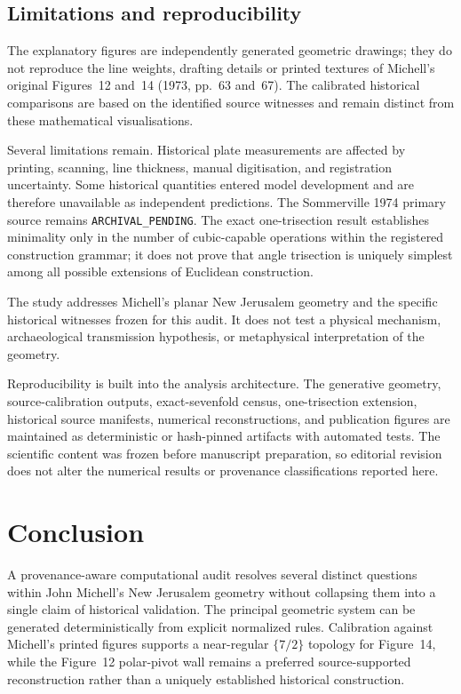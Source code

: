 \documentclass[11pt]{article}
\newcommand{\ArchivePending}{\texttt{ARCHIVAL\_PENDING}}
\begin{document}
\subsection{Limitations and reproducibility}

The explanatory figures are independently generated geometric drawings; they do not reproduce the line weights, drafting details or printed textures of Michell's original Figures~12 and~14 (1973, pp.~63 and~67). The calibrated historical comparisons are based on the identified source witnesses and remain distinct from these mathematical visualisations.\par



Several limitations remain.  Historical plate measurements are affected by
printing, scanning, line thickness, manual digitisation, and registration
uncertainty.  Some historical quantities entered model development and are
therefore unavailable as independent predictions.  The Sommerville 1974
primary source remains \ArchivePending{}.  The exact one-trisection result
establishes minimality only in the number of cubic-capable operations within
the registered construction grammar; it does not prove that angle trisection
is uniquely simplest among all possible extensions of Euclidean construction.

The study addresses Michell's planar New Jerusalem geometry and the specific
historical witnesses frozen for this audit.  It does not test a physical
mechanism, archaeological transmission hypothesis, or metaphysical
interpretation of the geometry.

Reproducibility is built into the analysis architecture.  The generative
geometry, source-calibration outputs, exact-sevenfold census, one-trisection
extension, historical source manifests, numerical reconstructions, and
publication figures are maintained as deterministic or hash-pinned artifacts
with automated tests.  The scientific content was frozen before manuscript
preparation, so editorial revision does not alter the numerical results or
provenance classifications reported here.

\section{Conclusion}

A provenance-aware computational audit resolves several distinct questions
within John Michell's New Jerusalem geometry without collapsing them into a
single claim of historical validation.  The principal geometric system can be
generated deterministically from explicit normalized rules.  Calibration
against Michell's printed figures supports a near-regular $\{7/2\}$ topology
for Figure~14, while the Figure~12 polar-pivot wall remains a preferred
source-supported reconstruction rather than a uniquely established historical
construction.
\end{document}
